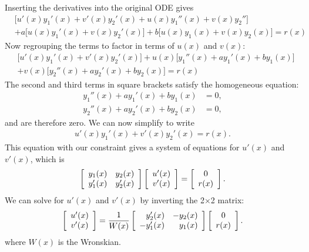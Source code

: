 Inserting the derivatives into the original ODE gives
\begin{align}
  &\bigg[ u'(x) y_1'(x) + v'(x) y_2'(x) + u(x) y_1''(x) + v(x) y_2'' \bigg] \nonumber \\
  &+ a \bigg[ u(x) y_1'(x) + v(x) y_2'(x) \bigg] + b \bigg[ u(x) y_1(x) + v(x) y_2(x) \bigg] = r(x) \nonumber
\end{align}
Now regrouping the terms to factor in terms of $u(x)$ and $v(x)$:
\begin{align}
  &\bigg[ u'(x) y_1'(x) + v'(x) y_2'(x) \bigg] + u(x) \bigg[  y_1''(x) + a y_1'(x) + b y_1(x) \bigg] \nonumber \\
   &+ v(x)  \bigg[  y_2''(x) + a y_2'(x) + b y_2(x) \bigg] = r(x)
\end{align}
The second and third terms in square brackets satisfy the homogeneous equation:
\begin{align}
  y_1''(x) + a y_1'(x) + b y_1(x) &= 0, \nonumber \\
  y_2''(x) + a y_2'(x) + b y_2(x) &= 0, \nonumber 
\end{align}
and are therefore zero. We can now simplify to write
\begin{align}
  u'(x) y_1'(x) + v'(x) y_2'(x) = r(x).
\end{align}
This equation with our constraint gives a system of equations for $u'(x)$ and $v'(x)$, which is
\begin{align}
  \left[ \begin{array}{r r}
  y_1(x)  & y_2(x)  \\
  y_1'(x) & y_2'(x) \\ \end{array} \right]
  \left[ \begin{array}{c} u'(x) \\ v'(x) \\ \end{array} \right] =
  \left[ \begin{array}{c} 0 \\ r(x) \\ \end{array} \right] .
\end{align}
We can solve for $u'(x)$ and $v'(x)$ by inverting the 2$\times$2 matrix:
\begin{align}
  \left[ \begin{array}{c} u'(x) \\ v'(x) \\ \end{array} \right] =
  \frac{1}{W(x)} \left[ \begin{array}{r r}
  y_2'(x)  & -y_2(x)  \\
  -y_1'(x) & y_1(x) \\ \end{array} \right] 
  \left[ \begin{array}{c} 0 \\ r(x) \\ \end{array} \right] .
\end{align}
where $W(x)$ is the Wronskian.

